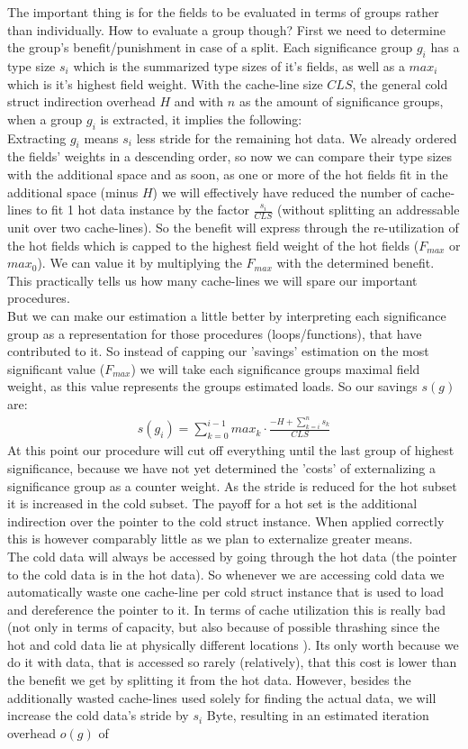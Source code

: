 The important thing is for the fields to be evaluated in terms of groups rather than individually. How to evaluate a group though? First we need to determine the group's benefit/punishment in case of a split. Each significance group $g_i$ has a type size $s_i$ which is the summarized type sizes of it's fields, as well as a $max_i$ which is it's highest field weight. With the cache-line size $CLS$, the general cold struct indirection overhead $H$ and with $n$ as the amount of significance groups, when a group $g_i$ is extracted, it implies the following:\\
Extracting $g_i$ means $s_i$ less stride for the remaining hot data. We already ordered the fields' weights in a descending order, so now we can compare their type sizes with the additional space and as soon, as one or more of the hot fields fit in the additional space (minus $H$) we will effectively have reduced the number of cache-lines to fit 1 hot data instance by the factor $\frac{s_i}{CLS}$ (without splitting an addressable unit over two cache-lines). So the benefit will express through the re-utilization of the hot fields which is capped to the highest field weight of the hot fields ($F_{max}$ or $max_0$). We can value it by multiplying the $F_{max}$ with the determined benefit. This practically tells us how many cache-lines we will spare our important procedures.\\
But we can make our estimation a little better by interpreting each significance group as a representation for those procedures (loops/functions), that have contributed to it. So instead of capping our 'savings' estimation on the most significant value ($F_{max}$) we will take each significance groups maximal field weight, as this value represents the groups estimated loads. So our savings $s(g)$ are:
\begin{align}
	s(g_i) = \sum_{k=0}^{i-1}max_k\cdot\frac{-H+\sum_{k=i}^{n}s_k}{CLS}
\end{align}
At this point our procedure will cut off everything until the last group of highest significance, because we have not yet determined the 'costs' of externalizing a significance group as a counter weight. As the stride is reduced for the hot subset it is increased in the cold subset. The payoff for a hot set is the additional indirection over the pointer to the cold struct instance. When applied correctly this is however comparably little as we plan to externalize greater means.\\
The cold data will always be accessed by going through the hot data (the pointer to the cold data is in the hot data). So whenever we are accessing cold data we automatically waste one cache-line per cold struct instance that is used to load and dereference the pointer to it. In terms of cache utilization this is really bad (not only in terms of capacity, but also because of possible thrashing since the hot and cold data lie at physically different locations ). Its only worth because we do it with data, that is accessed so rarely (relatively), that this cost is lower than the benefit we get by splitting it from the hot data. However, besides the additionally wasted cache-lines used solely for finding the actual data, we will increase the cold data's stride by $s_i$ Byte, resulting in an estimated iteration overhead $o(g)$ of
